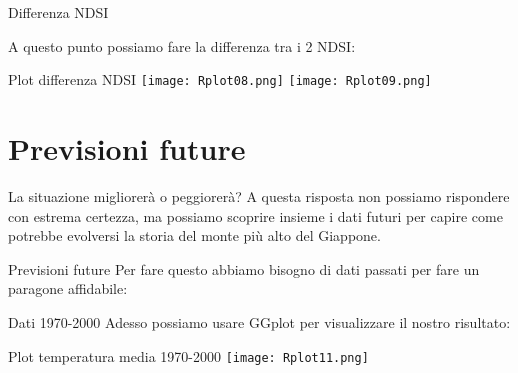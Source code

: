 \documentclass{beamer}
\begin{document}

\begin{frame}{Differenza NDSI}

A questo punto possiamo fare la differenza tra i 2 NDSI:
\bigskip

\scriptsize 
    
\end{frame}

\begin{frame}{Plot differenza NDSI}
\centering
\texttt{[image: Rplot08.png]}  
\texttt{[image: Rplot09.png]}  
    
\end{frame}



\section{Previsioni future}
\bigskip
\begin{frame}{La situazione migliorerà o peggiorerà?}
A questa risposta non possiamo rispondere con estrema certezza, ma possiamo scoprire insieme i dati futuri per capire come potrebbe evolversi la storia del monte più alto del Giappone.
\end{frame}



\begin{frame}{Previsioni future}
Per fare questo abbiamo bisogno di dati passati per fare un paragone affidabile:
\bigskip
\scriptsize 
    
\end{frame}

\begin{frame}{Dati 1970-2000}
Adesso possiamo usare GGplot per visualizzare il nostro risultato:
\tiny 

\end{frame}

\begin{frame}{Plot temperatura media 1970-2000}
    \centering
\texttt{[image: Rplot11.png]}  
\end{frame}
\end{document}
